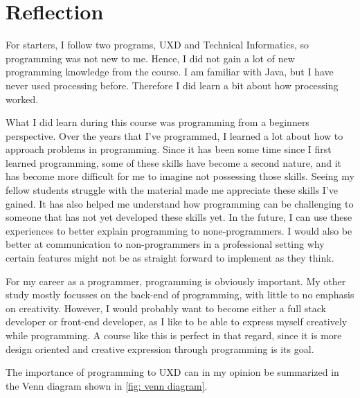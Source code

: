 \chapter{Reflection}

For starters, I follow two programs, UXD and Technical Informatics, so programming was not new to me. Hence, I did not gain a lot of new programming knowledge from the course. I am familiar with Java, but I have never used processing before. Therefore I did learn a bit about how processing worked.

\medskip

What I did learn during this course was programming from a beginners perspective. Over the years that I've programmed, I learned a lot about how to approach problems in programming. Since it has been some time since I first learned programming, some of these skills have become a second nature, and it has become more difficult for me to imagine not possessing those skills. Seeing my fellow students struggle with the material made me appreciate these skills I've gained. It has also helped me understand how programming can be challenging to someone that has not yet developed these skills yet. In the future, I can use these experiences to better explain programming to none-programmers. I would also be better at communication to non-programmers in a professional setting why certain features might not be as straight forward to implement as they think. 

\medskip

For my career as a programmer, programming is obviously important. My other study mostly focusses on the back-end of programming, with little to no emphasis on creativity. However, I would probably want to become either a full stack developer or front-end developer, as I like to be able to express myself creatively while programming. A course like this is perfect in that regard, since it is more design oriented and creative expression through programming is its goal. 

\medskip

The importance of programming to UXD can in my opinion be summarized in the Venn diagram shown in \cref{fig: venn diagram}.

